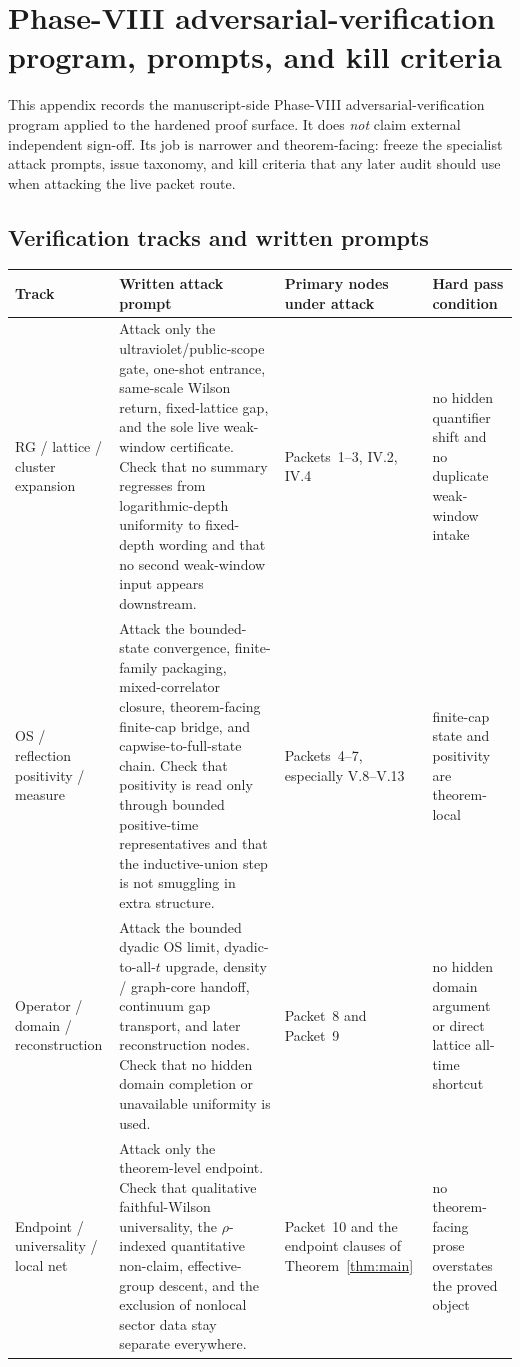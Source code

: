 \section{Phase-VIII adversarial-verification program, prompts, and kill criteria}\label{app:kernel-redteam}

This appendix records the manuscript-side Phase-VIII adversarial-verification program applied to the hardened proof surface. It does \emph{not} claim external independent sign-off. Its job is narrower and theorem-facing: freeze the specialist attack prompts, issue taxonomy, and kill criteria that any later audit should use when attacking the live packet route.

\subsection*{Verification tracks and written prompts}
\begin{center}
\small
\setlength{\tabcolsep}{4pt}
\renewcommand{\arraystretch}{1.08}
\begin{tabular}{@{}p{2.55cm}p{4.95cm}p{2.8cm}p{2.3cm}@{}}
\toprule
\textbf{Track} & \textbf{Written attack prompt} & \textbf{Primary nodes under attack} & \textbf{Hard pass condition}\\
\midrule
RG / lattice / cluster expansion & Attack only the ultraviolet/public-scope gate, one-shot entrance, same-scale Wilson return, fixed-lattice gap, and the sole live weak-window certificate. Check that no summary regresses from logarithmic-depth uniformity to fixed-depth wording and that no second weak-window input appears downstream. & Packets~1--3, IV.2, IV.4 & no hidden quantifier shift and no duplicate weak-window intake\\
OS / reflection positivity / measure & Attack the bounded-state convergence, finite-family packaging, mixed-correlator closure, theorem-facing finite-cap bridge, and capwise-to-full-state chain. Check that positivity is read only through bounded positive-time representatives and that the inductive-union step is not smuggling in extra structure. & Packets~4--7, especially V.8--V.13 & finite-cap state and positivity are theorem-local\\
Operator / domain / reconstruction & Attack the bounded dyadic OS limit, dyadic-to-all-$t$ upgrade, density / graph-core handoff, continuum gap transport, and later reconstruction nodes. Check that no hidden domain completion or unavailable uniformity is used. & Packet~8 and Packet~9 & no hidden domain argument or direct lattice all-time shortcut\\
Endpoint / universality / local net & Attack only the theorem-level endpoint. Check that qualitative faithful-Wilson universality, the $\rho$-indexed quantitative non-claim, effective-group descent, and the exclusion of nonlocal sector data stay separate everywhere. & Packet~10 and the endpoint clauses of Theorem~\ref{thm:main} & no theorem-facing prose overstates the proved object\\
\bottomrule
\end{tabular}
\end{center}

